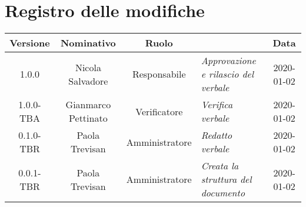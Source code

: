 \section*{Registro delle modifiche}
\renewcommand{\arraystretch}{1.8}

  \begin{longtable}{|c|c|c|p{3.8cm}|c|}
    \hline

    \rowcolor{header}
    \textbf{Versione} & \textbf{Nominativo} & \textbf{Ruolo} & \centering{\textbf{Descrizione}} & \textbf{Data}\\

    \hline
    1.0.0 & Nicola Salvadore & Responsabile & \small{\textit{Approvazione e rilascio del verbale}} & 2020-01-02\\
    1.0.0-TBA & Gianmarco Pettinato & Verificatore & \small{\textit{Verifica verbale}} & 2020-01-02\\
	0.1.0-TBR & Paola Trevisan & Amministratore & \small{\textit{Redatto verbale}} & 2020-01-02\\
    0.0.1-TBR & Paola Trevisan & Amministratore & \small{\textit{Creata la struttura del documento}} & 2020-01-02\\

    \hline
  \end{longtable}
